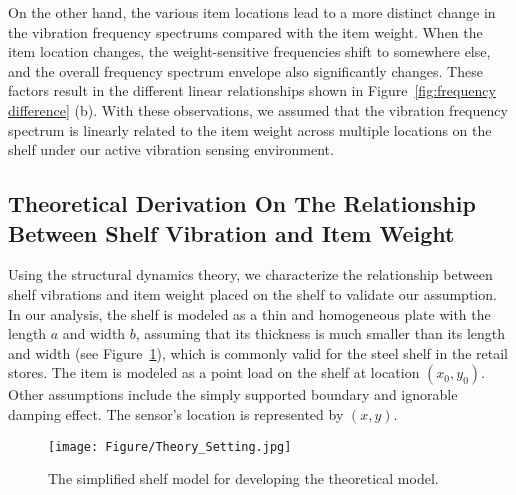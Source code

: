 On the other hand, the various item locations lead to a more distinct change in the vibration frequency spectrums compared with the item weight. When the item location changes, the weight-sensitive frequencies shift to somewhere else, and the overall frequency spectrum envelope also significantly changes. These factors result in the different linear relationships shown in Figure~\ref{fig:frequency difference} (b). With these observations, we assumed that the vibration frequency spectrum is linearly related to the item weight across multiple locations on the shelf under our active vibration sensing environment.

\subsection{Theoretical Derivation On The Relationship Between Shelf Vibration and Item Weight}
\label{sec:theory}
Using the structural dynamics theory, we characterize the relationship between shelf vibrations and item weight placed on the shelf to validate our assumption. In our analysis, the shelf is modeled as a thin and homogeneous plate with the length $a$ and width $b$, assuming that its thickness is much smaller than its length and width (see Figure~\ref{fig:Theory}), which is commonly valid for the steel shelf in the retail stores. The item is modeled as a point load on the shelf at location $(x_0, y_0)$. Other assumptions include the simply supported boundary and ignorable damping effect. The sensor's location is represented by $(x,y)$.
\begin{figure}[tbh]
    \centering
    \texttt{[image: Figure/Theory\_Setting.jpg]}
    \caption{The simplified shelf model for developing the theoretical model.}
    \label{fig:Theory}
\end{figure}

